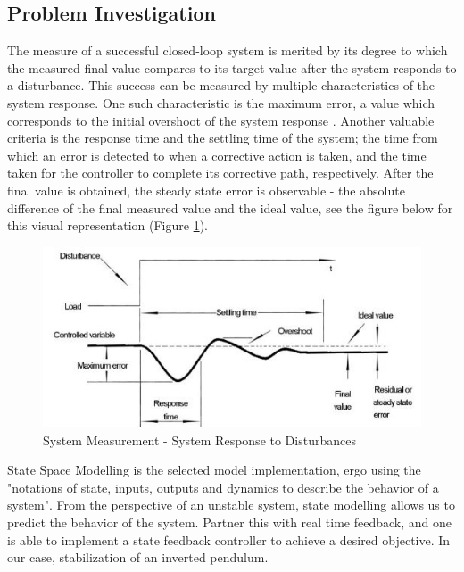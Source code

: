 \documentclass[12pt]{article}
\begin{document}
\subsection{Problem Investigation}
The measure of a successful closed-loop system is merited by its degree to which the measured final value compares to its target value after the system responds to a disturbance. This success can be measured by multiple characteristics of the system response. One such characteristic is the maximum error, a value which corresponds to the initial overshoot of the system response \cite{OCLoop}. Another valuable criteria is the response time and the settling time of the  system; the time from which an error is detected to when a corrective action is taken, and the time taken for the controller to complete its corrective path, respectively. After the final value is obtained, the steady state error is observable - the absolute difference of the final measured value and the ideal value, see the figure below for this visual representation (Figure \ref{fig:Resp}).
\begin{figure}[H]
    \centering
    \includegraphics[width=.7\linewidth]{figures/System response.JPG}
    \caption{System Measurement - System Response to Disturbances  \cite{OCLoop}}
    \label{fig:Resp}
\end{figure}

State Space Modelling is the selected model implementation, ergo using the "notations of state, inputs, outputs and dynamics to describe the behavior of a system"\cite{StateSpace}. From the perspective of an unstable system, state modelling allows us to predict the behavior of the system. Partner this with real time feedback, and one is able to implement a state feedback controller to achieve a desired objective. In our case, stabilization of an inverted pendulum.
\end{document}
